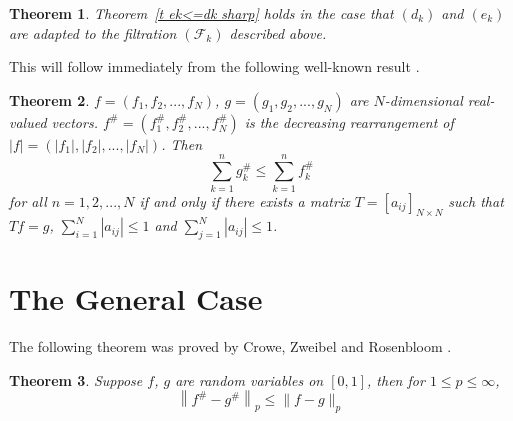 \documentclass[12pt]{amsart}
\newtheorem{thm}{Theorem}
\begin{document}
\begin{thm}
\label{t ek<=dk sharp disc}
Theorem~\ref{t ek<=dk sharp} holds in the case that
$(d_k)$ and $(e_k)$ are
adapted to the filtration $(\mathcal F_k)$ described above.
\end{thm}

This will follow immediately from the following 
well-known result \cite[p.~124]{LT}.
\begin{thm}
\label{t fsharp<=gsharp}
$f=(f_1,f_2,...,f_N)$, $g=(g_1,g_2,...,g_N)$ are $N$-dimensional
real-valued vectors. $f^\#=(f_1^\#,f_2^\#,...,f_N^\#)$ is the
decreasing rearrangement of $|f|=(|f_1|,|f_2|,...,|f_N|)$. Then
\[ \sum_{k=1}^n g_k^\#\leq \sum_{k=1}^n f_k^\# \]
for all $n=1,2,...,N$ if and only if there exists a matrix
$T=[a_{ij}]_{N \times N}$ such that $Tf=g$, $\sum_{i=1}^N
|a_{ij}|\leq 1$ and $\sum_{j=1}^N |a_{ij}|\leq 1$.
\end{thm}









\section{The General Case}
The following theorem was proved by Crowe, Zweibel and Rosenbloom
\cite{CZR}.
\begin{thm}
\label{t CZR}
Suppose $f$, $g$ are random variables on $[0,1]$, then for $1\leq
p\leq \infty $,
\[\left\|f^\# -g^\# \right\|_p\leq \|f -g\|_p\]
\end{thm}
\end{document}
